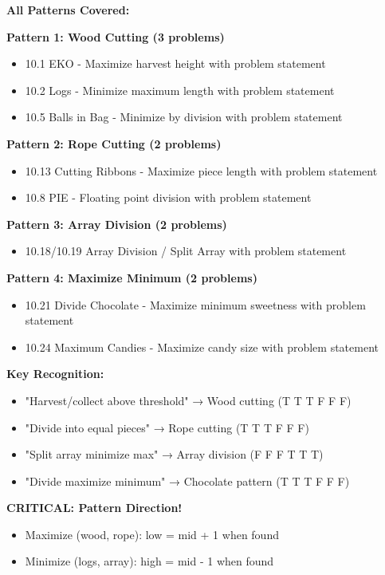 \documentclass[11pt,a4paper,oneside]{book}
\begin{document}
\begin{tcolorbox}[
    enhanced,breakable,
    colback=primaryblue!10,
    colframe=primaryblue,
    boxrule=2pt,
    arc=4mm,
    title=\textbf{Cutting and Division Problems: Complete Mastery}
]
\textbf{All Patterns Covered:}

\textbf{Pattern 1: Wood Cutting (3 problems)}
\begin{itemize}
\item 10.1 EKO - Maximize harvest height with problem statement
\item 10.2 Logs - Minimize maximum length with problem statement
\item 10.5 Balls in Bag - Minimize by division with problem statement
\end{itemize}

\textbf{Pattern 2: Rope Cutting (2 problems)}
\begin{itemize}
\item 10.13 Cutting Ribbons - Maximize piece length with problem statement
\item 10.8 PIE - Floating point division with problem statement
\end{itemize}

\textbf{Pattern 3: Array Division (2 problems)}
\begin{itemize}
\item 10.18/10.19 Array Division / Split Array with problem statement
\end{itemize}

\textbf{Pattern 4: Maximize Minimum (2 problems)}
\begin{itemize}
\item 10.21 Divide Chocolate - Maximize minimum sweetness with problem statement
\item 10.24 Maximum Candies - Maximize candy size with problem statement
\end{itemize}

\textbf{Key Recognition:}
\begin{itemize}
\item "Harvest/collect above threshold" → Wood cutting (T T T F F F)
\item "Divide into equal pieces" → Rope cutting (T T T F F F)
\item "Split array minimize max" → Array division (F F F T T T)
\item "Divide maximize minimum" → Chocolate pattern (T T T F F F)
\end{itemize}

\textbf{CRITICAL: Pattern Direction!}
\begin{itemize}
\item Maximize (wood, rope): low = mid + 1 when found
\item Minimize (logs, array): high = mid - 1 when found
\end{itemize}


\end{tcolorbox}
\end{document}
